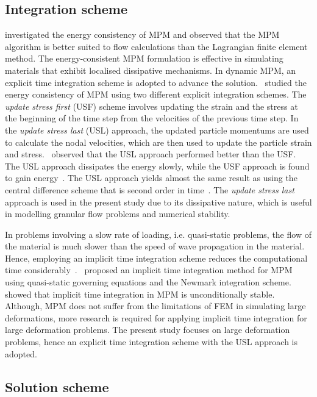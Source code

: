 \subsection{Integration scheme}

\citet{Love2006} investigated the energy consistency of MPM and observed that 
the MPM algorithm is better suited to flow calculations than the Lagrangian 
finite element method. The energy-consistent MPM formulation is effective 
in simulating materials that exhibit localised dissipative mechanisms. In 
dynamic MPM, an explicit time integration scheme is 
adopted to advance the solution.~\citet{Bardenhagen2002} studied the energy 
consistency of MPM using two different explicit integration schemes. The 
\textit{update stress first} (USF) scheme involves updating the strain and the 
stress at the beginning of the time step from the velocities of the previous 
time step. In the \textit{update stress last} (USL) approach, the updated 
particle momentums are used to calculate the nodal velocities, which are then 
used to update the particle strain and stress.~\citet{Bardenhagen2002} observed 
that the USL approach performed better 
than the USF. The USL approach dissipates the energy slowly, while the USF 
approach is found to gain energy~\citep{Kafaji2013}. The USL approach yields 
almost the same result as using the central difference scheme that is second 
order in time~\citep{Wallstedt2008}. The \textit{update stress last} approach 
is used in the present study due to its dissipative nature, which is useful in 
modelling granular flow problems and numerical stability.

In problems involving a slow rate of loading, i.e. quasi-static problems, the 
flow of the material is much slower than the speed of wave propagation in the 
material. Hence, employing an implicit time integration scheme reduces the 
computational time considerably~\citep{Kafaji2013}.~\citet{Guilkey2003a} 
proposed an implicit time integration method for MPM using quasi-static 
governing equations and the Newmark integration scheme.~\citet{Love2006} 
showed that implicit time integration in MPM is unconditionally stable. 
Although, MPM does not suffer from the limitations of FEM in simulating large 
deformations, more research is required for applying implicit time integration 
for large deformation problems. The present study focuses on large deformation 
problems, hence an explicit time integration scheme with the USL approach is 
adopted.

\subsection{Solution scheme}

